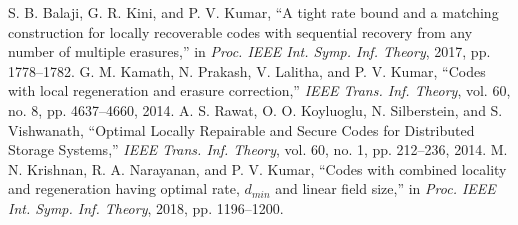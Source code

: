 \begin{multicols}{2}
\begin{thebibliography}{99}
 S. B. Balaji, G. R. Kini, and P. V. Kumar, ``A tight rate bound and a matching construction for locally recoverable codes with sequential recovery from any number of multiple erasures,'' in \textit{Proc. IEEE Int. Symp. Inf. Theory}, 2017, pp. 1778--1782.
 G. M. Kamath, N. Prakash, V. Lalitha, and P. V. Kumar, ``Codes with local regeneration and erasure correction,'' \textit{IEEE Trans. Inf. Theory}, vol. 60, no. 8, pp. 4637--4660, 2014.
 A. S. Rawat, O. O. Koyluoglu, N. Silberstein, and S. Vishwanath, ``Optimal Locally Repairable and Secure Codes for Distributed Storage Systems,'' \textit{IEEE Trans. Inf. Theory}, vol. 60, no. 1, pp. 212--236, 2014.
 M. N. Krishnan, R. A. Narayanan, and P. V. Kumar, ``Codes with combined locality and regeneration having optimal rate, $d_{min}$ and linear field size,'' in \textit{Proc. IEEE Int. Symp. Inf. Theory}, 2018, pp. 1196--1200.
\end{thebibliography}
\end{multicols}






 
